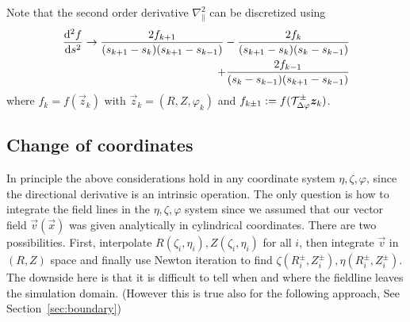 Note that the second order derivative $\nabla_\parallel^2$ can be
discretized using
\begin{align}
    \frac{\mathrm{d}^2 f}{\mathrm{d} s^2} \rightarrow
     \frac{2f_{k+1}}{(s_{k+1}-s_k)(s_{k+1}-s_{k-1})}
    -\frac{2f_{k}}{(s_{k+1}-s_k)(s_{k}-s_{k-1})} \nonumber\\
    +\frac{2f_{k-1}}{(s_{k}-s_{k-1})(s_{k+1}-s_{k-1})}
    \label{}
\end{align}
where $f_k = f(\vec z_k)$ with $\vec z_k = (R,Z,\varphi_k)$ and $f_{k\pm 1} := f(\mathcal T^\pm_{\Delta\varphi} {\boldsymbol{z}}_k)$.

\subsection{Change of coordinates}
In principle the above considerations hold in any
coordinate system $\eta,\zeta,\varphi$, since the directional derivative is
an intrinsic operation.
The only question is how to integrate the field lines in the
$\eta, \zeta,\varphi$ system
since we assumed that our vector field $\vec v(\vec x)$ was given
analytically in
cylindrical coordinates. There are two possibilities.
First, interpolate $R(\zeta_i, \eta_i), Z(\zeta_i, \eta_i)$ for
all $i$, then integrate $\vec v$ in $(R,Z)$ space and finally use
Newton iteration to find $\zeta(R^\pm_i, Z^\pm_i), \eta(R^\pm_i, Z^\pm_i)$.
The downside here is that it is difficult to tell when and where the fieldline leaves the simulation domain. (However this is true also for the
following approach, See Section~\ref{sec:boundary})

